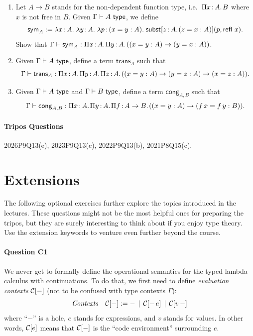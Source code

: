 \documentclass[11pt,a4paper,twoside]{article}
\begin{document}
\begin{enumerate}[label=(\alph*)]
  \item Let $A \to B$ stands for the non-dependent function type,
    i.e.~$\Pi x \,{:}\, A .\;\! B$ where $x$ is not free in $B$.
    Given $\Gamma \vdash A\ \mathsf{type}$, we define
    \[
      \mathsf{sym}_A :=
      \lambda x \,{:}\, A .\; 
        \lambda y \,{:}\, A .\; 
          \lambda p \,{:}\, (x = y : A) .\; 
            \mathsf{subst}[z \,{:}\, A .\;\! (z = x : A)](p, \mathsf{refl}\ x)
     .
    \]
    Show that $\Gamma \vdash \mathsf{sym}_A :
    \Pi x \,{:}\, A .\;\! \Pi y \,{:}\, A .\;\! ((x = y : A) \to (y = x : A))$.

  \item Given $\Gamma \vdash A\ \mathsf{type}$, define a term
    $\mathsf{trans}_A$ such that
    \[
      \Gamma \vdash \mathsf{trans}_A :
      \Pi x \,{:}\, A .\;\! \Pi y \,{:}\, A .\;\! \Pi z \,{:}\, A .\;\! 
            ((x = y : A) \to (y = z : A) \to (x = z : A))
     .
    \]

  \item Given $\Gamma \vdash A\ \mathsf{type}$ and $\Gamma \vdash B\ \mathsf{type}$,
    define a term $\mathsf{cong}_{A,B}$ such that
    \[
      \Gamma \vdash \mathsf{cong}_{A, B} :
      \Pi x \,{:}\, A .\;\! \Pi y \,{:}\, A .\;\! \Pi f \,{:}\, A \to B .\;\! 
            ((x = y : A) \to (f \, x = f \, y : B))
     .
    \]
\end{enumerate}

\paragraph{Tripos Questions} 2026P9Q13(e), 2023P9Q13(c), 2022P9Q13(b), 2021P8Q15(c).

\section*{Extensions}

The following optional exercises further explore the topics
introduced in the lectures. These questions might not be the most
helpful ones for preparing the tripos, but they are surely
interesting to think about if you enjoy type theory. Use the
extension keywords to venture even further beyond the course.

\paragraph{Question C1}
We never get to formally define the operational semantics
for the typed lambda calculus with continuations.
To do that, we first need to define \emph{evaluation contexts} $\mathcal{C}[-]$
(not to be confused with type contexts $\Gamma$):
\[
  \mathit{Contexts}\quad \mathcal{C}[-] := - \,\mid\, \mathcal{C}[- \, e]
  \,\mid\, \mathcal{C}[v \, -]
\]
where ``$-$'' is a hole, $e$ stands for expressions, and $v$ stands for values.
In other words, $\mathcal{C}[e]$ means that $\mathcal{C}[-]$ is the ``code
environment'' surrounding $e$.
\end{document}

